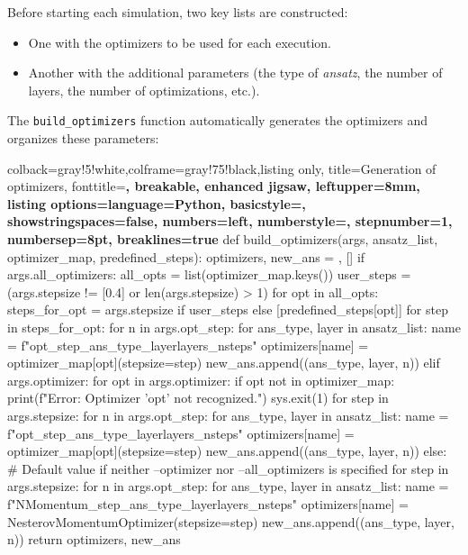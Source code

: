 Before starting each simulation, two key lists are constructed:
\begin{itemize}
    \item One with the optimizers to be used for each execution.
    \item Another with the additional parameters (the type of \emph{ansatz}, the number of layers, the number of optimizations, etc.).
\end{itemize}

The \texttt{build\_optimizers} function automatically generates the optimizers and organizes these parameters:

\begin{tcblisting}{colback=gray!5!white,colframe=gray!75!black,listing only,
    title=Generation of optimizers, fonttitle=\bfseries, breakable, enhanced jigsaw, leftupper=8mm,
    listing options={language=Python, basicstyle=\ttfamily\small,
    showstringspaces=false, numbers=left, numberstyle=\footnotesize,
    stepnumber=1, numbersep=8pt, breaklines=true}}
def build_optimizers(args, ansatz_list, optimizer_map, predefined_steps):
    optimizers, new_ans = {}, []
    if args.all_optimizers:
        all_opts = list(optimizer_map.keys())
        user_steps = (args.stepsize != [0.4] or len(args.stepsize) > 1)
        for opt in all_opts:
            steps_for_opt = args.stepsize if user_steps else [predefined_steps[opt]]
            for step in steps_for_opt:
                for n in args.opt_step:
                    for ans_type, layer in ansatz_list:
                        name = f"{opt}_{step}_{ans_type}_{layer}layers_{n}steps"
                        optimizers[name] = optimizer_map[opt](stepsize=step)
                        new_ans.append((ans_type, layer, n))
    elif args.optimizer:
        for opt in args.optimizer:
            if opt not in optimizer_map:
                print(f"Error: Optimizer '{opt}' not recognized.")
                sys.exit(1)
            for step in args.stepsize:
                for n in args.opt_step:
                    for ans_type, layer in ansatz_list:
                        name = f"{opt}_{step}_{ans_type}_{layer}layers_{n}steps"
                        optimizers[name] = optimizer_map[opt](stepsize=step)
                        new_ans.append((ans_type, layer, n))
    else:
        # Default value if neither --optimizer nor --all_optimizers is specified
        for step in args.stepsize:
            for n in args.opt_step:
                for ans_type, layer in ansatz_list:
                    name = f"NMomentum_{step}_{ans_type}_{layer}layers_{n}steps"
                    optimizers[name] = NesterovMomentumOptimizer(stepsize=step)
                    new_ans.append((ans_type, layer, n))
    return optimizers, new_ans
\end{tcblisting}

